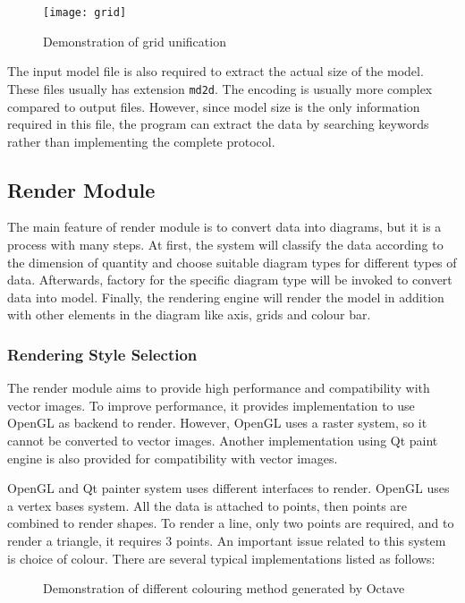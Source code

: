 \begin{figure}[!htb]
	\centering
	\texttt{[image: grid]}
	\caption{Demonstration of grid unification}
	\label{fig:grid}
\end{figure}

The input model file is also required to extract the actual size of the model. These files usually has extension \lstinline{md2d}. The encoding is usually more complex compared to output files. However, since model size is the only information required in this file, the program can extract the data by searching keywords rather than implementing the complete protocol.

\subsection{Render Module}

The main feature of render module is to convert data into diagrams, but it is a process with many steps. At first, the system will classify the data according to the dimension of quantity and choose suitable diagram types for different types of data. Afterwards, factory for the specific diagram type will be invoked to convert data into model. Finally, the rendering engine will render the model in addition with other elements in the diagram like axis, grids and colour bar.

\subsubsection{Rendering Style Selection}

The render module aims to provide high performance and compatibility with vector images. To improve performance, it provides implementation to use OpenGL as backend to render. However, OpenGL uses a raster system, so it cannot be converted to vector images. Another implementation using Qt paint engine is also provided for compatibility with vector images.

OpenGL and Qt painter system uses different interfaces to render. OpenGL uses a vertex bases system. All the data is attached to points, then points are combined to render shapes. To render a line, only two points are required, and to render a triangle, it requires 3 points. An important issue related to this system is choice of colour. There are several typical implementations listed as follows:

\begin{figure}[!tb]
	\centering
	\caption{Demonstration of different colouring method generated by Octave}
	\label{fig:interp}
\end{figure}

